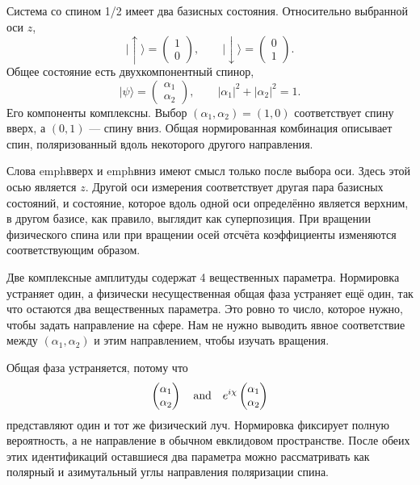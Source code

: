 Система со спином 1/2 имеет два базисных состояния. Относительно выбранной оси \(z\),
\begin{equation}
\lvert\uparrow\rangle=
\begin{pmatrix}1\\0\end{pmatrix},
\qquad
\lvert\downarrow\rangle=
\begin{pmatrix}0\\1\end{pmatrix}.
\end{equation}
Общее состояние есть двухкомпонентный спинор,
\begin{equation}
\lvert\psi\rangle=
\begin{pmatrix}\alpha_1\\\alpha_2\end{pmatrix},
\qquad
|\alpha_1|^2+|\alpha_2|^2=1.
\label{eq:l3-spinor}
\end{equation}
Его компоненты комплексны. Выбор \((\alpha_1,\alpha_2)=(1,0)\) соответствует спину вверх, а \((0,1)\) — спину вниз. Общая нормированная комбинация описывает спин, поляризованный вдоль некоторого другого направления.

Слова emph{вверх} и emph{вниз} имеют смысл только после выбора оси. Здесь этой осью является \(z\). Другой оси измерения соответствует другая пара базисных состояний, и состояние, которое вдоль одной оси определённо является верхним, в другом базисе, как правило, выглядит как суперпозиция. При вращении физического спина или при вращении осей отсчёта коэффициенты изменяются соответствующим образом.

Две комплексные амплитуды содержат 4 вещественных параметра. Нормировка устраняет один, а физически несущественная общая фаза устраняет ещё один, так что остаются два вещественных параметра. Это ровно то число, которое нужно, чтобы задать направление на сфере. Нам не нужно выводить явное соответствие между \((\alpha_1,\alpha_2)\) и этим направлением, чтобы изучать вращения.

Общая фаза устраняется, потому что
\begin{equation}
\begin{pmatrix}\alpha_1\\\alpha_2\end{pmatrix}
\quad\hbox{and}\quad
e^{i\chi}
\begin{pmatrix}\alpha_1\\\alpha_2\end{pmatrix}
\end{equation}
представляют один и тот же физический луч. Нормировка фиксирует полную вероятность, а не направление в обычном евклидовом пространстве. После обеих этих идентификаций оставшиеся два параметра можно рассматривать как полярный и азимутальный углы направления поляризации спина.

